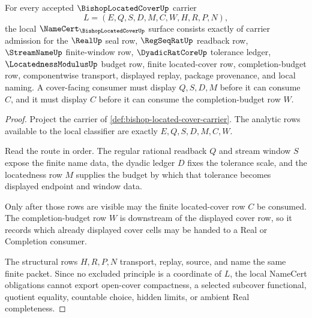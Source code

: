 \begin{theorem}
\label{thm:bishop-located-cover-namecert-obligations}
For every accepted $\BishopLocatedCoverUp$ carrier
$$
L=(E,Q,S,D,M,C,W,H,R,P,N),
$$
the local $\NameCert_{\BishopLocatedCoverUp}$ surface consists exactly of carrier admission for the $\RealUp$ seal row, $\RegSeqRatUp$ readback row, $\StreamNameUp$ finite-window row, $\DyadicRatCoreUp$ tolerance ledger, $\LocatednessModulusUp$ budget row, finite located-cover row, completion-budget row, componentwise transport, displayed replay, package provenance, and local naming. A cover-facing consumer must display $Q,S,D,M$ before it can consume $C$, and it must display $C$ before it can consume the completion-budget row $W$.
\end{theorem}
\begin{proof}
Project the carrier of \autoref{def:bishop-located-cover-carrier}. The analytic rows available to the local classifier are exactly $E,Q,S,D,M,C,W$.

Read the route in order. The regular rational readback $Q$ and stream window $S$ expose the finite name data, the dyadic ledger $D$ fixes the tolerance scale, and the locatedness row $M$ supplies the budget by which that tolerance becomes displayed endpoint and window data.

Only after those rows are visible may the finite located-cover row $C$ be consumed. The completion-budget row $W$ is downstream of the displayed cover row, so it records which already displayed cover cells may be handed to a Real or Completion consumer.

The structural rows $H,R,P,N$ transport, replay, source, and name the same finite packet. Since no excluded principle is a coordinate of $L$, the local NameCert obligations cannot export open-cover compactness, a selected subcover functional, quotient equality, countable choice, hidden limits, or ambient Real completeness.
\end{proof}

